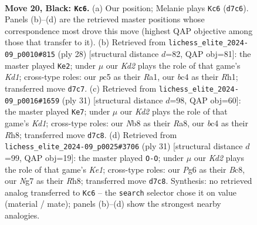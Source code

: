 \documentclass[11pt]{article}
\begin{document}
\clearpage

\begin{figure}[p]\centering
\begin{subfigure}{0.46\textwidth}\centering
\resizebox{\linewidth}{!}{%
\newchessgame
\chessboard[
  setfen={rn2bbr1/1p1k2np/4p1p1/p1P3B1/P1B1P3/2N5/1P3RPP/3RN1K1 b - - 3 20},
  showmover=false,
  pgfstyle=straightmove, color=movearrow, markmove={d7-c6}
]}
\caption{}
\end{subfigure}\hfill
\begin{subfigure}{0.46\textwidth}\centering
\resizebox{\linewidth}{!}{%
\newchessgame
\chessboard[
  setfen={2kr1b1r/pp3p2/2n1pn2/2p4p/4P3/2P1NP2/PPB2P2/R1BK3R w - - 1 15},
  showmover=false,
  pgfstyle=straightmove, color=movearrow, markmove={d1-e2}
]}
\caption{}
\end{subfigure}
\\[4pt]
\begin{subfigure}{0.46\textwidth}\centering
\resizebox{\linewidth}{!}{%
\newchessgame
\chessboard[
  setfen={r1bk3r/pp4b1/2n2np1/5pB1/2N1p3/6Pp/PPN1PPBP/R2R2K1 b - - 1 16},
  showmover=false,
  pgfstyle=straightmove, color=movearrow, markmove={d8-e7}
]}
\caption{}
\end{subfigure}\hfill
\begin{subfigure}{0.46\textwidth}\centering
\resizebox{\linewidth}{!}{%
\newchessgame
\chessboard[
  setfen={r1b1k2r/1p3ppp/p4n2/4b3/P1B4R/2N5/1P3PPP/R1B3K1 b kq - 2 16},
  showmover=false,
  pgfstyle=straightmove, color=movearrow, markmove={e8-g8}
]}
\caption{}
\end{subfigure}
\caption{\textbf{Move 20, Black: \texttt{Kc6}.} (a) Our position; Melanie plays \texttt{Kc6} (\texttt{d7c6}). Panels (b)--(d) are the retrieved master positions whose correspondence most drove this move (highest QAP objective among those that transfer to it). (b) Retrieved from \texttt{lichess\_elite\_2024-09\_p0010\#815} (ply 28) [structural distance $d$=82, QAP obj=81]: the master played \texttt{Ke2}; under $\mu$ our \emph{Kd2} plays the role of that game's \emph{Kd1}; cross-type roles: our \emph{p}c5 as their \emph{R}a1, our \emph{b}c4 as their \emph{R}h1; transferred move \texttt{d7c7}. (c) Retrieved from \texttt{lichess\_elite\_2024-09\_p0016\#1659} (ply 31) [structural distance $d$=98, QAP obj=60]: the master played \texttt{Ke7}; under $\mu$ our \emph{Kd2} plays the role of that game's \emph{Kd1}; cross-type roles: our \emph{N}b8 as their \emph{R}a8, our \emph{b}c4 as their \emph{R}h8; transferred move \texttt{d7c8}. (d) Retrieved from \texttt{lichess\_elite\_2024-09\_p0025\#3706} (ply 31) [structural distance $d$=99, QAP obj=19]: the master played \texttt{O-O}; under $\mu$ our \emph{Kd2} plays the role of that game's \emph{Ke1}; cross-type roles: our \emph{P}g6 as their \emph{B}c8, our \emph{N}g7 as their \emph{R}h8; transferred move \texttt{d7c8}. Synthesis: no retrieved analog transferred to \texttt{Kc6} -- the \texttt{search} selector chose it on value (material / mate); panels (b)--(d) show the strongest nearby analogies.}
\label{fig:thought-m39}
\end{figure}
\end{document}
